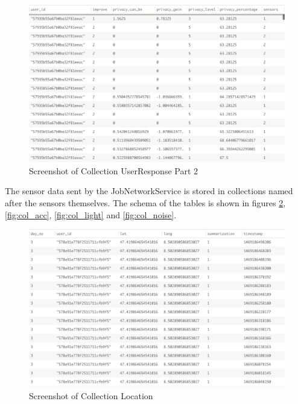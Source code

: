 \begin{figure}[ht!]
\centering
\includegraphics[width=\textwidth,keepaspectratio,height=0.6\textwidth]{./images/collection_ur_2}
\caption{Screenshot of Collection UserResponse Part 2}
\label{fig:col_ur_2}
\end{figure}

The sensor data sent by the JobNetworkService is stored in collections named after the sensors themselves. The schema of the tables
is shown in figures \ref{fig:col_loc}, \ref{fig:col_acc}, \ref{fig:col_light} and \ref{fig:col_noise}.

\begin{figure}[ht!]
\centering
\includegraphics[width=\textwidth,keepaspectratio,height=0.6\textwidth]{./images/collection_loc}
\caption{Screenshot of Collection Location}
\label{fig:col_loc}
\end{figure}

